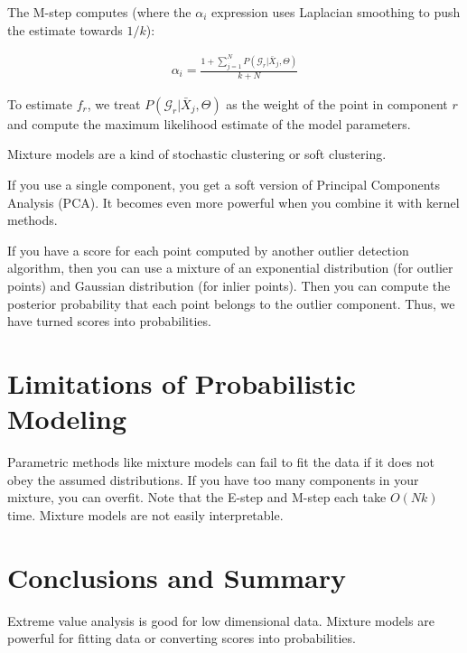 \documentclass[a4paper]{article}
\begin{document}
The M-step computes (where the $\alpha_i$ expression uses Laplacian smoothing
to push the estimate towards $1/k$):

\begin{align}
  \alpha_i = \frac{1 + \sum_{j=1}^{N}{P(\mathcal{G}_r | \bar{X}_j, \Theta)}}{
  k + N}
\end{align}

To estimate $f_r$, we treat $P(\mathcal{G}_r | \bar{X}_j, \Theta)$ as the
weight of the point in component $r$ and compute the maximum likelihood estimate
of the model parameters.

Mixture models are a kind of stochastic clustering or soft clustering.

If you use a single component, you get a soft version of Principal Components
Analysis (PCA). It becomes even more powerful when you combine it with
kernel methods.

If you have a score for each point computed by another outlier detection
algorithm, then you can use a mixture of an exponential distribution (for
outlier points) and Gaussian distribution (for inlier points). Then you
can compute the posterior probability that each point belongs to the outlier
component. Thus, we have turned scores into probabilities.

\section{Limitations of Probabilistic Modeling}
Parametric methods like mixture models can fail to fit the data if it does
not obey the assumed distributions. If you have too many components in your
mixture, you can overfit. Note that the E-step and M-step each take $O(Nk)$
time. Mixture models are not easily interpretable.


\section{Conclusions and Summary}
Extreme value analysis is good for low dimensional data. Mixture models are
powerful for fitting data or converting scores into probabilities.
\end{document}
